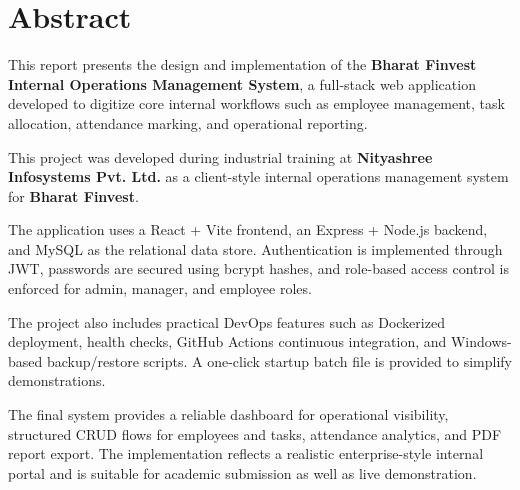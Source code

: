 \chapter*{Abstract}
This report presents the design and implementation of the \textbf{Bharat Finvest Internal Operations Management System}, a full-stack web application developed to digitize core internal workflows such as employee management, task allocation, attendance marking, and operational reporting.

This project was developed during industrial training at \textbf{Nityashree Infosystems Pvt. Ltd.} as a client-style internal operations management system for \textbf{Bharat Finvest}.

The application uses a React + Vite frontend, an Express + Node.js backend, and MySQL as the relational data store. Authentication is implemented through JWT, passwords are secured using bcrypt hashes, and role-based access control is enforced for admin, manager, and employee roles.

The project also includes practical DevOps features such as Dockerized deployment, health checks, GitHub Actions continuous integration, and Windows-based backup/restore scripts. A one-click startup batch file is provided to simplify demonstrations.

The final system provides a reliable dashboard for operational visibility, structured CRUD flows for employees and tasks, attendance analytics, and PDF report export. The implementation reflects a realistic enterprise-style internal portal and is suitable for academic submission as well as live demonstration.
